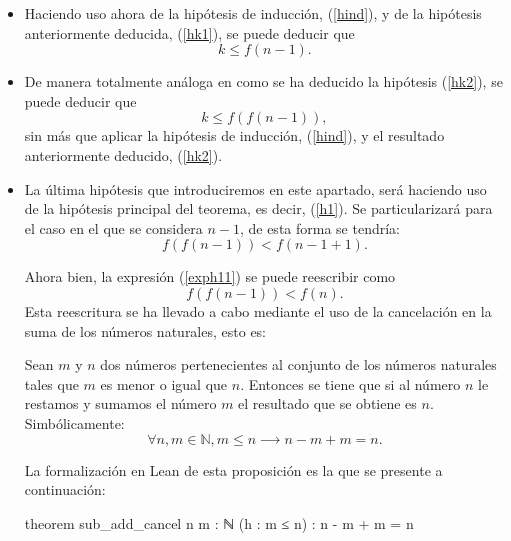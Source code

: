\begin{demostracion}
\begin{itemize}
\begin{itemize}
      \item Haciendo uso ahora de la hipótesis de inducción,
        (\ref{hind}), y de la hipótesis anteriormente deducida,
        (\ref{hk1}), se puede deducir que
        \begin{equation}\label{hk2}\tag{hk2}
          k≤f(n-1).
        \end{equation}

      \item De manera totalmente análoga en como se ha deducido
        la hipótesis (\ref{hk2}), se puede deducir que
        \begin{equation}\label{hk3}\tag{hk3}
          k≤f(f(n-1)),
        \end{equation}
        sin más que aplicar la hipótesis de inducción, (\ref{hind}),
        y el resultado anteriormente deducido, (\ref{hk2}).

      \item La última hipótesis que introduciremos en este apartado,
        será haciendo uso de la hipótesis principal del teorema,
        es decir, (\ref{h1}). Se particularizará para el caso en el
        que se considera \(n-1\), de esta forma se tendría:
        \begin{equation}\label{exph11}
          f(f(n-1))<f(n-1+1).
        \end{equation}

        Ahora bien, la expresión (\ref{exph11}) se puede reescribir
        como
        \begin{equation}\label{h11}\tag{h11}
          f(f(n-1))<f(n).
        \end{equation}
        Esta reescritura se ha llevado a cabo mediante el uso de
        la cancelación en la suma de los números naturales, esto es:

        \begin{proposicion}\label{sumanat}
          Sean \(m\) y \(n\) dos números pertenecientes al conjunto
          de los números naturales tales que \(m\) es menor o igual
          que \(n\). Entonces se tiene que si al número \(n\) le
          restamos y sumamos el número \(m\) el resultado que se
          obtiene es \(n\). Simbólicamente:
          \begin{equation}
            ∀n,m ∈ ℕ, m≤n ⟶ n-m+m=n.
          \end{equation}
        \end{proposicion}

        La formalización en Lean de esta proposición es la que se
        presente a continuación:
        \begin{leancode}
          theorem sub_add_cancel {n m : ℕ} (h : m ≤ n) : n - m + m = n 
        \end{leancode}
      \end{itemize}


\end{itemize}
\end{demostracion}
